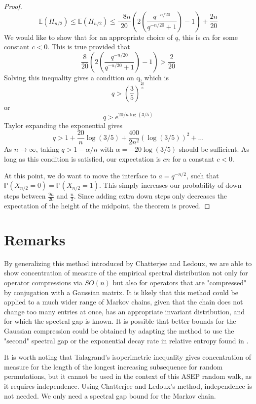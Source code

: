 \documentclass[12pt]{report}
\theoremstyle{definition}
\begin{document}
\begin{proof}
$$
\mathbb{E}(H_{n/2})\leq \mathbb{E}(H_{n/2})\leq \frac{-8n}{20}\left(2\left(\frac{q^{-n/20}}{q^{-n/20}+1}\right)-1\right) + \frac{2n}{20}
$$
We would like to show that for an appropriate choice of $q$, this is $cn$ for some constant $c<0$.  This is true provided that 
$$
\frac{8}{20}\left(2\left(\frac{q^{-n/20}}{q^{-n/20}+1}\right)-1\right)>\frac{2}{20}
$$
Solving this inequality gives a condition on q, which is 
$$
q>\left(\frac{3}{5}\right)^{\frac{20}{n}}
$$
or 
$$
q>e^{20/n\log(3/5)}
$$
Taylor expanding the exponential gives 
$$
q> 1+\frac{20}{n}\log(3/5)+\frac{400}{2n^2}(\log(3/5))^2+\dots
$$
As $n\rightarrow\infty$, taking $q>1-\alpha/n$ with $\alpha=-20\log(3/5)$ should be sufficient.  
As long as this condition is satisfied, our expectation is $cn$ for a constant $c<0$.  

At this point, we do want to move the interface to $a=q^{-n/2}$, such that $\mathbb{P}(X_{n/2}=0)=\mathbb{P}(X_{n/2}=1)$.  This simply increases our probability of down steps between $\frac{9n}{20}$ and $\frac{n}{2}$.  Since adding extra down steps only decreases the expectation of the height of the midpoint, the theorem is proved. 
\end{proof}
\section{Remarks}
By generalizing this method introduced by Chatterjee and Ledoux, we are able to show concentration of measure of the empirical spectral distribution not only for operator compressions via $SO(n)$ but also for operators that are "compressed" by conjugation with a Gaussian matrix.  It is likely that this method could be applied to a much wider range of Markov chains, given that the chain does not change too many entries at once, has an appropriate invariant distribution, and for which the spectral gap is known.  It is possible that better bounds for the Gaussian compression could be obtained by adapting the method to use the "second" spectral gap or the exponential decay rate in relative entropy found in \cite{BLV}. 

It is worth noting that Talagrand's isoperimetric inequality \cite{Talagrand} gives concentration of measure for the length of the longest increasing subsequence for random permutations, but it cannot be used in the context of this ASEP random walk, as it requires independence.  Using Chatterjee and Ledoux's method, independence is not needed.  We only need a spectral gap bound for the Markov chain.    
\\ \\
\end{document}
